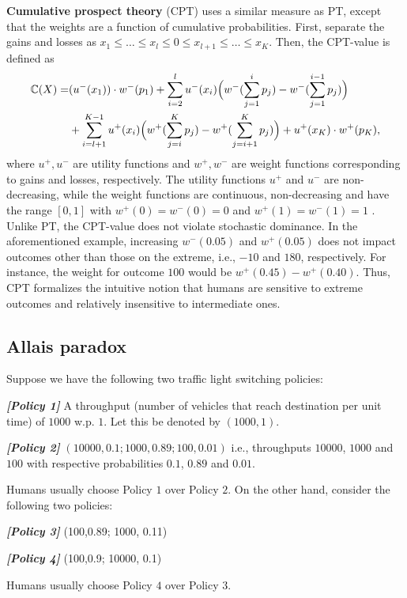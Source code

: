 \documentclass{article}
\numberwithin{equation}{section}
\numberwithin{theorem}{section}
\begin{document}
\textbf{Cumulative prospect theory} (CPT) \cite{tversky1992advances} uses a similar measure as PT, except that the weights are a function of cumulative probabilities. First, separate the gains and losses as 
$x_1\le \ldots \le x_l \le 0 \le x_{l+1} \le \ldots \le x_K$. Then, the CPT-value is defined as 
\begin{align*}
\mathbb{C}(X) = &(u^-(x_1))\cdot w^-(p_1) 
+\sum_{i=2}^l u^-(x_i) \Big(w^-(\sum_{j=1}^i p_j) - w^-(\sum_{j=1}^{i-1} p_j)\Big) 
\\&
 + \sum_{i=l+1}^{K-1} u^+(x_i) \Big(w^+(\sum_{j=i}^K p_j) - w^+(\sum_{j=i+1}^K p_j) \Big)
 + u^+(x_K)\cdot w^+(p_K), 
\end{align*} 
where $u^+, u^-$ are utility functions and $w^+, w^-$ are weight functions corresponding to gains and losses, respectively. The utility functions $u^+$ and $u^-$ are non-decreasing, while the weight functions are continuous, non-decreasing and have the range $[0,1]$ with $w^+(0)=w^-(0)=0$ and $w^+(1)=w^-(1)=1$ . 
Unlike PT, the CPT-value does not violate stochastic dominance. In the aforementioned example, increasing $w^-(0.05)$ and $w^+(0.05)$ does not impact outcomes other than those on the extreme, i.e., $-10$ and $180$, respectively. For instance, the weight for outcome $100$ would be $w^+(0.45) - w^+(0.40)$. Thus, CPT formalizes the intuitive notion that humans are sensitive to extreme outcomes and relatively insensitive to intermediate ones.

\subsection*{Allais paradox}
Suppose we have the following two traffic light switching policies:

\textbf{\textit{[Policy 1]}} A throughput (number of vehicles that reach destination per unit time) of $1000$  w.p. $1$. Let this be denoted by $(1000,1)$.

\textbf{\textit{[Policy 2]}}  $(10000, 0.1; 1000,0.89; 100, 0.01)$ i.e., throughputs $10000$, $1000$ and $100$ with respective probabilities $0.1$, $0.89$ and $0.01$.

Humans usually choose Policy $1$ over Policy $2$. On the other hand, consider the following two policies:

\textbf{\textit{[Policy 3]}} (100,0.89; 1000, 0.11)

\textbf{\textit{[Policy 4]}} (100,0.9; 10000, 0.1)

Humans usually choose Policy $4$ over Policy $3$. 
\end{document}
